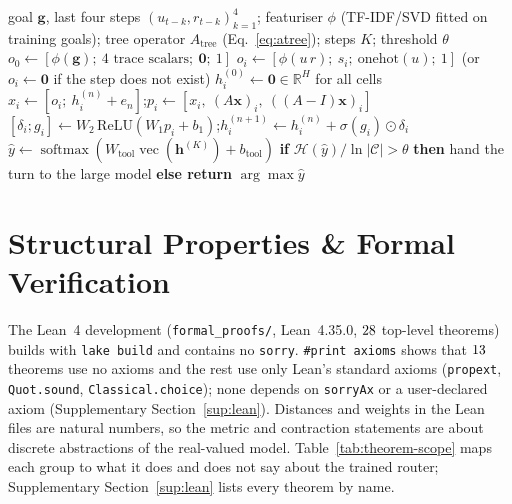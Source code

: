 \documentclass[10pt]{article}
\begin{document}
\begin{algorithm}[t]
\caption{Tree-GNCA next-tool router (one turn). Training fits $\Theta=(W_1,b_1,W_2,e_{1..K},W_{\text{tool}},b_{\text{tool}})$ by cross-entropy on the tool head; inference is deterministic.}
\label{alg:router}
\small
\begin{algorithmic}[1]
\Require goal $\mathbf g$, last four steps $(u_{t-k},r_{t-k})_{k=1}^{4}$; featuriser $\phi$ (TF-IDF/SVD fitted on training goals); tree operator $A_{\text{tree}}$ (Eq.~\eqref{eq:atree}); steps $K$; threshold $\theta$
\State $o_0 \gets [\phi(\mathbf g);\ \text{4 trace scalars};\ \mathbf 0;\ 1]$ 
 
  \State $o_i \gets [\phi(u\,r);\ s_i;\ \mathrm{onehot}(u);\ 1]$ 
  \State \hspace{1em}(or $o_i \gets \mathbf 0$ if the step does not exist)
\EndFor
\State $h_i^{(0)} \gets \mathbf 0 \in\mathbb R^{H}$ for all cells
 
  \State $x_i \gets [o_i;\ h_i^{(n)}+e_n]$;\quad $p_i \gets [x_i,\ (A\mathbf x)_i,\ ((A-I)\mathbf x)_i]$
  \State $[\delta_i; g_i] \gets W_2\,\mathrm{ReLU}(W_1 p_i + b_1)$;\quad $h_i^{(n+1)} \gets h_i^{(n)} + \sigma(g_i)\odot\delta_i$
\EndFor
\State $\hat y \gets \operatorname{softmax}(W_{\text{tool}}\operatorname{vec}(\mathbf h^{(K)}) + b_{\text{tool}})$
\State \textbf{if} $\mathcal H(\hat y)/\ln|\mathcal C| > \theta$ \textbf{then} hand the turn to the large model \textbf{else return} $\arg\max \hat y$ 
\end{algorithmic}
\end{algorithm}

\section{Structural Properties \& Formal Verification}\label{sec:formal}
The Lean~4 development (\texttt{formal\_\allowbreak{}proofs/}, Lean~4.35.0, $28$ top-level theorems) builds with \texttt{lake build} and contains no \texttt{sorry}. \texttt{\#print axioms} shows that $13$ theorems use no axioms and the rest use only Lean's standard axioms (\texttt{propext}, \texttt{Quot.sound}, \texttt{Classical.choice}); none depends on \texttt{sorryAx} or a user-declared axiom (Supplementary Section~\ref{sup:lean}). Distances and weights in the Lean files are natural numbers, so the metric and contraction statements are about discrete abstractions of the real-valued model. Table~\ref{tab:theorem-scope} maps each group to what it does and does not say about the trained router; Supplementary Section~\ref{sup:lean} lists every theorem by name.
\end{document}
